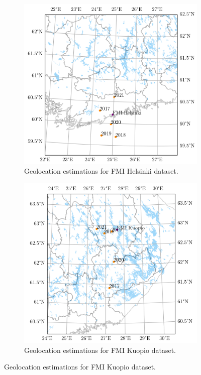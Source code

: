 \begin{figure}[h]
	
     \centering
     \begin{subfigure}[b]{0.45\textwidth}
         \centering
         \includegraphics[width=\textwidth]{pics/geolocationmap2}
         \caption{Geolocation estimations for FMI Helsinki dataset.}
         \label{fig_geolocationhelsinki}
     \end{subfigure}
     \hfill
     \begin{subfigure}[b]{0.45\textwidth}
         \centering
         \includegraphics[width=\textwidth]{pics/geolocationmap3}
         \caption{Geolocation estimations for FMI Kuopio dataset.}
         
         \label{fig_geolocationkuopio}
     \end{subfigure}
     \hfill
     \label{fig_anglespace}
\end{figure}

